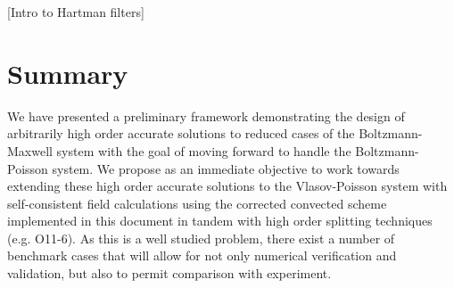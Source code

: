 \documentclass[11pt,titlepage]{report}
\begin{document}
[Intro to Hartman filters]



\chapter{Summary}

\indent\indent We have presented a preliminary framework demonstrating the design of arbitrarily high order accurate solutions to reduced cases of the Boltzmann-Maxwell system with the goal of moving forward to handle the Boltzmann-Poisson system. We propose as an immediate objective to work towards extending these high order accurate solutions to the Vlasov-Poisson system with self-consistent field calculations using the corrected convected scheme implemented in this document in tandem with high order splitting techniques (e.g. O11-6). As this is a well studied problem, there exist a number of benchmark cases that will allow for not only numerical verification and validation, but also to permit comparison with experiment. 
\end{document}

